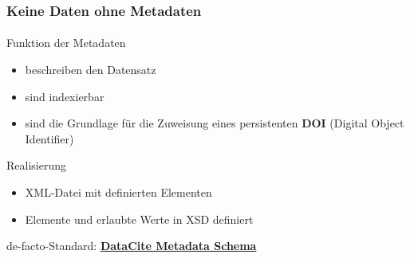 \begin{frame}
    \frametitle{Keine Daten ohne Metadaten}
    \framesubtitle{}


    \begin{block}{Funktion der Metadaten}
        \begin{itemize}
            \item beschreiben den Datensatz
            \item sind indexierbar
            \item sind die Grundlage für die Zuweisung eines persistenten \textbf{DOI} \newline(Digital Object Identifier)    
        \end{itemize}
    \end{block}




    \begin{block}{Realisierung}
        \begin{itemize}
            \item XML-Datei mit definierten Elementen
            \item Elemente und erlaubte Werte in XSD definiert
        \end{itemize}

        de-facto-Standard: \textbf{\href{https://schema.datacite.org/}{DataCite Metadata Schema}} \ExternalLink
    \end{block}


\end{frame}
